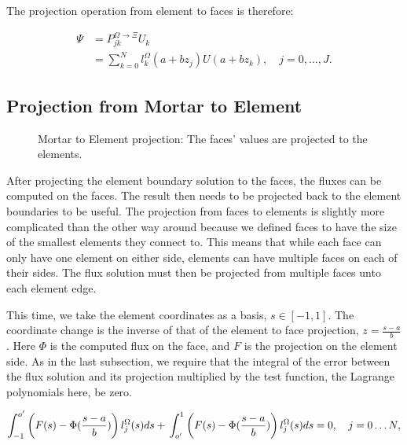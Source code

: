 The projection operation from element to faces is therefore:

\begin{align}  \label{projection_element_to_face}
	\Psi &= P_{jk}^{\Omega \rightarrow \Xi} U_k  \\
	&= \sum_{k = 0}^{N}l_k ^ \Omega(a+ b z_j) U(a + b z_k), \quad j = 0, \ldots, J.
\end{align}

\subsection{Projection from Mortar to Element}\label{subsection:adaptive_mesh_refinement:mortar_element_method:mortar_to_element}

\begin{figure}[H]
	\centering
	
	\caption{Mortar to Element projection: The faces' values are projected to the elements.}\label{fig:mortar_to_element}
\end{figure}

After projecting the element boundary solution to the faces, the fluxes can be computed on the
faces. The result then needs to be projected back to the element boundaries to be useful. The
projection from faces to elements is slightly more complicated than the other way around because we
defined faces to have the size of the smallest elements they connect to. This means that while each
face can only have one element on either side, elements can have multiple faces on each of their
sides. The flux solution must then be projected from multiple faces unto each element edge.

This time, we take the element coordinates as a basis, \(s \in [-1, 1]\). The coordinate change is
the inverse of that of the element to face projection, \(z = \frac{s - a}{b}\). Here \(\Phi \) is
the computed flux on the face, and \(F\) is the projection on the element side. As in the last
subsection, we require that the integral of the error between the flux solution and its projection
multiplied by the test function, the Lagrange polynomials here, be zero.

\begin{equation} \label{equ:zero_error_to_element}
	\int_{-1}^{o'} \left( F(s) - \Phi (\frac{s - a}{b}) \right) l_j^\Omega(s)ds + \\
	\int_{o'}^{1} \left( F(s) - \Phi (\frac{s - a}{b}) \right) l_j^\Omega (s)ds = 0, \\
	\quad j = 0 \ldots N,
\end{equation}

